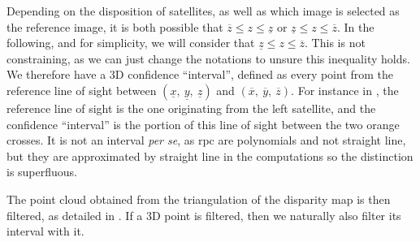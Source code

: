 Depending on the disposition of satellites, as well as which image is selected as the reference image, it is both possible that $\overline{z}\leqslant z \leqslant \underline{z}$ or $\underline{z}\leqslant z \leqslant \overline{z}$. In the following, and for simplicity, we will consider that $\underline{z}\leqslant z \leqslant \overline{z}$. This is not constraining, as we can just change the notations to unsure this inequality holds. We therefore have a 3D confidence ``interval'', defined as every point from the reference line of sight between $(\underline{x}, ~\underline{y}, ~\underline{z})$ and $(\overline{x}, ~\overline{y}, ~\overline{z})$. For instance in , the reference line of sight is the one originating from the left satellite, and the confidence ``interval'' is the portion of this line of sight between the two orange crosses. It is not an interval \textit{per se}, as \acrshort{rpc} are polynomials and not straight line, but they are approximated by straight line in the computations so the distinction is superfluous. 

The point cloud obtained from the triangulation of the disparity map is then filtered, as detailed in . If a 3D point is filtered, then we naturally also filter its interval with it. 

